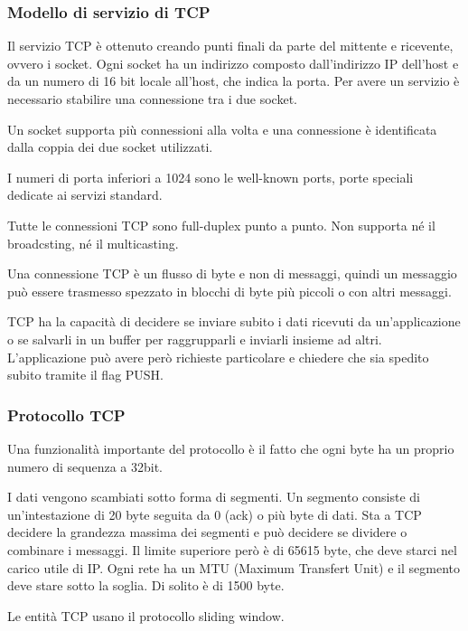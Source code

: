 \subsubsection{Modello di servizio di TCP}
Il servizio TCP è ottenuto creando punti finali da parte del mittente e ricevente, ovvero i socket.
Ogni socket ha un indirizzo composto dall'indirizzo IP dell'host e da un numero di 16 bit locale all'host, che indica la porta.
Per avere un servizio è necessario stabilire una connessione tra i due socket.

Un socket supporta più connessioni alla volta e una connessione è identificata dalla coppia dei due socket utilizzati.

I numeri di porta inferiori a 1024 sono le well-known ports, porte speciali dedicate ai servizi standard.

Tutte le connessioni TCP sono full-duplex punto a punto. Non supporta né il broadcsting, né il multicasting.

Una connessione TCP è un flusso di byte e non di messaggi, quindi un messaggio può essere trasmesso spezzato in blocchi di byte più piccoli o con altri messaggi. 

TCP ha la capacità di decidere se inviare subito i dati ricevuti da un'applicazione o se salvarli in un buffer per raggrupparli e inviarli insieme ad altri.
L'applicazione può avere però richieste particolare e chiedere che sia spedito subito tramite il flag PUSH.

\subsubsection{Protocollo TCP}
Una funzionalità importante del protocollo è il fatto che ogni byte ha un proprio numero di sequenza a 32bit.

I dati vengono scambiati sotto forma di segmenti.
Un segmento consiste di un'intestazione di 20 byte seguita da 0 (ack) o più byte di dati.
Sta a TCP decidere la grandezza massima dei segmenti e può decidere se dividere o combinare i messaggi.
Il limite superiore però è di 65615 byte, che deve starci nel carico utile di IP.
Ogni rete ha un MTU (Maximum Transfert Unit) e il segmento deve stare sotto la soglia.
Di solito è di 1500 byte.

Le entità TCP usano il protocollo sliding window.

